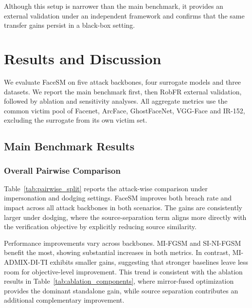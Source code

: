 \documentclass[a4paper,fleqn]{cas-dc}
\begin{document}
Although this setup is narrower than the main benchmark, it provides an external validation under an independent framework and confirms that the same transfer gains persist in a black-box setting.


\section{Results and Discussion}
We evaluate FaceSM on five attack backbones, four surrogate models and three datasets. We report the main benchmark first, then RobFR external validation, followed by ablation and sensitivity analyses. All aggregate metrics use the common victim pool of Facenet, ArcFace, GhostFaceNet, VGG-Face and IR-152, excluding the surrogate from its own victim set.

\subsection{Main Benchmark Results}

\subsubsection{Overall Pairwise Comparison}

Table~\ref{tab:pairwise_split} reports the attack-wise comparison under impersonation and dodging settings. FaceSM improves both breach rate and impact across all attack backbones in both scenarios. The gains are consistently larger under dodging, where the source-separation term aligns more directly with the verification objective by explicitly reducing source similarity.

Performance improvements vary across backbones. MI-FGSM and SI-NI-FGSM benefit the most, showing substantial increases in both metrics. In contrast, MI-ADMIX-DI-TI exhibits smaller gains, suggesting that stronger baselines leave less room for objective-level improvement. This trend is consistent with the ablation results in Table~\ref{tab:ablation_components}, where mirror-fused optimization provides the dominant standalone gain, while source separation contributes an additional complementary improvement.
\end{document}
